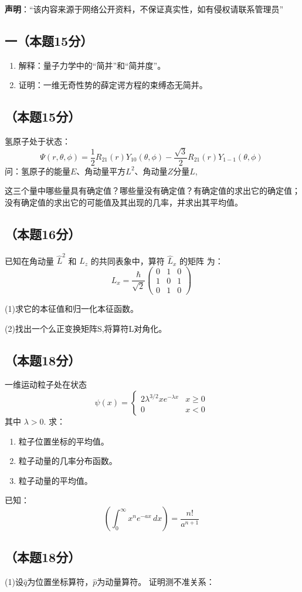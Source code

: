 
\textbf{声明}：“该内容来源于网络公开资料，不保证真实性，如有侵权请联系管理员”

\subsection{一（本题15分）}
\begin{enumerate}
\item 解释：量子力学中的“简并”和“简并度”。
\item 证明：一维无奇性势的薛定谔方程的束缚态无简并。
\end{enumerate}

\subsection{（本题15分）}
氢原子处于状态：
$$\Psi(r, \theta, \phi) = \frac{1}{2} R_{21}(r) Y_{10}(\theta, \phi) - \frac{\sqrt{3}}{2} R_{21}(r) Y_{1-1}(\theta, \phi)~$$
问：氢原子的能量$E$、角动量平方$L^2$、角动量$Z$分量$L$,

这三个量中哪些量具有确定值？哪些量没有确定值？有确定值的求出它的确定值；没有确定值的求出它的可能值及其出现的几率，并求出其平均值。

\subsection{（本题16分）}
已知在角动量 $\hat{L}^2$ 和 $\hat{L}_z$ 的共同表象中，算符 $\hat{L}_x$ 的矩阵
为：$$L_x = \frac{\hbar}{\sqrt{2}} \begin{pmatrix}
0 & 1 & 0 \\
1 & 0 & 1 \\
0 & 1 & 0
\end{pmatrix}~$$

(1)求它的本征值和归一化本征函数。

(2)找出一个么正变换矩阵S,将算符L对角化。

\subsection{（本题18分）}
一维运动粒子处在状态
$$\psi(x) = 
\begin{cases} 
2\lambda^{3/2} x e^{-\lambda x} &  x \geq 0 \\
0 &  x < 0
\end{cases}~$$
其中 $\lambda > 0$. 求：
\begin{enumerate}
    \item 粒子位置坐标的平均值。
    \item 粒子动量的几率分布函数。
    \item 粒子动量的平均值。
\end{enumerate}
已知：
$$\left( \int_{0}^{\infty} x^n e^{-ax} \, dx \right) = \frac{n!}{a^{n+1}}~$$

\subsection{（本题18分）}
(1)设$\hat q$为位置坐标算符，$\hat p$为动量算符。
证明测不准关系：
